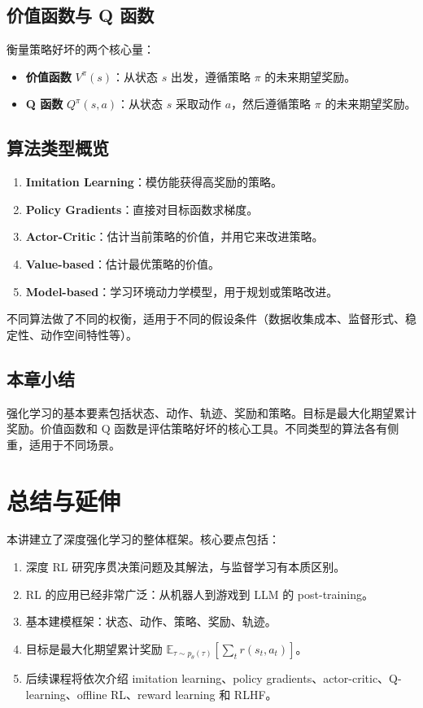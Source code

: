 \documentclass[a4paper]{article}
\begin{document}
\subsection{价值函数与 Q 函数}

衡量策略好坏的两个核心量：

\begin{itemize}
    \item \textbf{价值函数} $V^\pi(s)$：从状态 $s$ 出发，遵循策略 $\pi$ 的未来期望奖励。
    \item \textbf{Q 函数} $Q^\pi(s, a)$：从状态 $s$ 采取动作 $a$，然后遵循策略 $\pi$ 的未来期望奖励。
\end{itemize}

\subsection{算法类型概览}

\begin{enumerate}
    \item \textbf{Imitation Learning}：模仿能获得高奖励的策略。
    \item \textbf{Policy Gradients}：直接对目标函数求梯度。
    \item \textbf{Actor-Critic}：估计当前策略的价值，并用它来改进策略。
    \item \textbf{Value-based}：估计最优策略的价值。
    \item \textbf{Model-based}：学习环境动力学模型，用于规划或策略改进。
\end{enumerate}

不同算法做了不同的权衡，适用于不同的假设条件（数据收集成本、监督形式、稳定性、动作空间特性等）。

\subsection{本章小结}

强化学习的基本要素包括状态、动作、轨迹、奖励和策略。目标是最大化期望累计奖励。价值函数和 Q 函数是评估策略好坏的核心工具。不同类型的算法各有侧重，适用于不同场景。

\section{总结与延伸}

本讲建立了深度强化学习的整体框架。核心要点包括：

\begin{enumerate}
    \item 深度 RL 研究序贯决策问题及其解法，与监督学习有本质区别。
    \item RL 的应用已经非常广泛：从机器人到游戏到 LLM 的 post-training。
    \item 基本建模框架：状态、动作、策略、奖励、轨迹。
    \item 目标是最大化期望累计奖励 $\mathbb{E}_{\tau \sim p_\theta(\tau)} \left[\sum_t r(s_t, a_t)\right]$。
    \item 后续课程将依次介绍 imitation learning、policy gradients、actor-critic、Q-learning、offline RL、reward learning 和 RLHF。
\end{enumerate}
\end{document}
